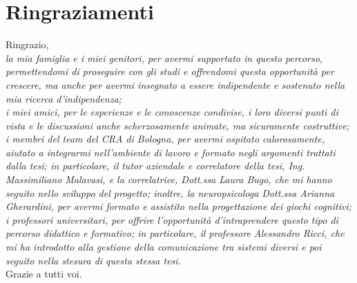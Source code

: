 
\chapter*{Ringraziamenti}

Ringrazio,\\

\textit{la mia famiglia e i miei genitori, per avermi supportato in questo
  percorso, permettendomi di proseguire con gli studi e offrendomi questa
  opportunità per crescere, ma anche per avermi insegnato a essere indipendente
  e sostenuto nella mia ricerca d'indipendenza;}\\

\textit{i miei amici, per le esperienze e le conoscenze condivise, i loro
  diversi punti di vista e le discussioni anche scherzosamente animate, ma
  sicuramente costruttive;}\\

\textit{i membri del team del CRA di Bologna, per avermi ospitato
  calorosamente, aiutato a integrarmi nell'ambiente di lavoro e formato negli
  argomenti trattati dalla tesi; in particolare, il tutor aziendale e correlatore
  della tesi, Ing. Massimiliano Malavasi, e la correlatrice, Dott.ssa Laura Bugo,
  che mi hanno seguito nello sviluppo del progetto; inoltre, la neuropsicologa
  Dott.ssa Arianna Gherardini, per avermi formato e assistito nella
  progettazione dei giochi cognitivi;}\\

\textit{i professori universitari, per offrire l'opportunità d'intraprendere
  questo tipo di percorso didattico e formativo; in particolare, il professore
  Alessandro Ricci, che mi ha introdotto alla gestione della comunicazione tra
  sistemi diversi e poi seguito nella stesura di questa stessa tesi.}\\

Grazie a tutti voi.